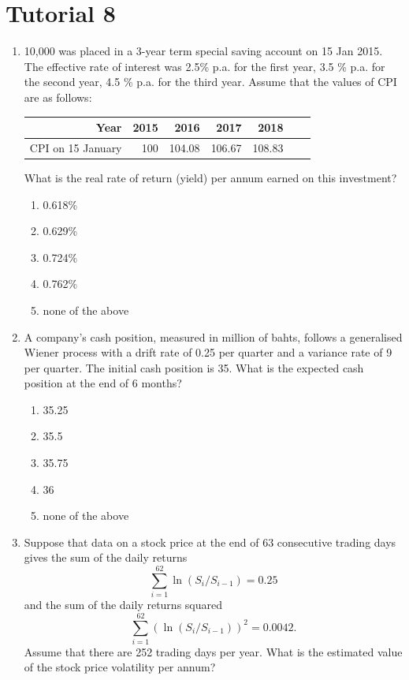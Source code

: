 \documentclass[
]{book}
\theoremstyle{definition}
\theoremstyle{definition}
\theoremstyle{definition}
\theoremstyle{definition}
\theoremstyle{remark}
\begin{document}
\section{Tutorial 8}\label{tutorial-8}

\begin{enumerate}
\def\labelenumi{\arabic{enumi}.}
\item
  10,000 was placed in a 3-year term special saving account on 15
  Jan 2015. The effective rate of interest was 2.5\% p.a. for the first
  year, 3.5 \% p.a. for the second year, 4.5 \% p.a. for the third year.
  Assume that the values of CPI are as follows:

  \begin{longtable}[]{@{}rrrrrll@{}}
  \toprule\noalign{}
  Year & 2015 & 2016 & 2017 & 2018 & & \\
  \midrule\noalign{}
  \endhead
  \bottomrule\noalign{}
  \endlastfoot
  CPI on 15 January & 100 & 104.08 & 106.67 & 108.83 & & \\
  \end{longtable}

  What is the real rate of return (yield) per annum earned on this
  investment?

  \begin{enumerate}
  \def\labelenumii{\Alph{enumii}.}
  \item
    0.618\%
  \item
    0.629\%
  \item
    0.724\%
  \item
    0.762\%
  \item
    none of the above
  \end{enumerate}
\item
  A company's cash position, measured in
  million of bahts, follows a generalised Wiener process with a drift
  rate of 0.25 per quarter and a variance rate of 9 per quarter. The
  initial cash position is 35. What is the expected cash position at
  the end of 6 months?

  \begin{enumerate}
  \def\labelenumii{\Alph{enumii}.}
  \item
    35.25
  \item
    35.5
  \item
    35.75
  \item
    36
  \item
    none of the above
  \end{enumerate}
\item
  Suppose that data on a stock price at
  the end of 63 consecutive trading days gives the sum of the daily
  returns \[\sum_{i=1}^{62} \ln(S_i/S_{i-1}) = 0.25\] and the sum of
  the daily returns squared
  \[\sum_{i=1}^{62} \left( \ln(S_i/S_{i-1}) \right)^2= 0.0042.\]
  Assume that there are 252 trading days per year. What is the
  estimated value of the stock price volatility per annum?


\end{enumerate}
\end{document}
